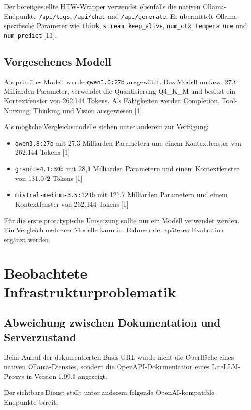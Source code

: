 \documentclass[11pt,a4paper,oneside,ngerman]{memoir}
\begin{document}
Der bereitgestellte HTW-Wrapper verwendet ebenfalls die nativen Ollama-Endpunkte \texttt{/api/tags}, \texttt{/api/chat} und \texttt{/api/generate}. Er übermittelt Ollama-spezifische Parameter wie \texttt{think}, \texttt{stream}, \texttt{keep\_alive}, \texttt{num\_ctx}, \texttt{temperature} und \texttt{num\_predict} [11].

\section{Vorgesehenes Modell}

Als primäres Modell wurde \texttt{qwen3.6:27b} ausgewählt. Das Modell umfasst 27,8 Milliarden Parameter, verwendet die Quantisierung Q4\_K\_M und besitzt ein Kontextfenster von 262.144 Tokens. Als Fähigkeiten werden Completion, Tool-Nutzung, Thinking und Vision ausgewiesen [1].

Als mögliche Vergleichsmodelle stehen unter anderem zur Verfügung:

\begin{itemize}
    \item \texttt{qwen3.8:27b} mit 27,3 Milliarden Parametern und einem Kontextfenster von 262.144 Tokens [1]
    \item \texttt{granite4.1:30b} mit 28,9 Milliarden Parametern und einem Kontextfenster von 131.072 Tokens [1]
    \item \texttt{mistral-medium-3.5:128b} mit 127,7 Milliarden Parametern und einem Kontextfenster von 262.144 Tokens [1]
\end{itemize}

Für die erste prototypische Umsetzung sollte nur ein Modell verwendet werden. Ein Vergleich mehrerer Modelle kann im Rahmen der späteren Evaluation ergänzt werden.

\chapter{Beobachtete Infrastrukturproblematik}

\section{Abweichung zwischen Dokumentation und Serverzustand}

Beim Aufruf der dokumentierten Basis-URL wurde nicht die Oberfläche eines nativen Ollama-Dienstes, sondern die OpenAPI-Dokumentation eines LiteLLM-Proxys in Version 1.99.0 angezeigt.

Der sichtbare Dienst stellt unter anderem folgende OpenAI-kompatible Endpunkte bereit:
\end{document}
